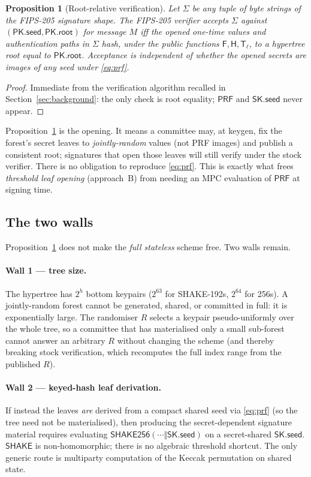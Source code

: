 \documentclass[11pt,a4paper]{article}
\newtheorem{proposition}[theorem]{Proposition}
\newcommand{\PRF}{\mathsf{PRF}}
\newcommand{\Fhash}{\mathsf{F}}
\newcommand{\Hhash}{\mathsf{H}}
\newcommand{\Tl}{\mathsf{T}_{\ell}}
\newcommand{\skseed}{\mathsf{SK.seed}}
\newcommand{\pkseed}{\mathsf{PK.seed}}
\newcommand{\pkroot}{\mathsf{PK.root}}
\begin{document}
\begin{proposition}[Root-relative verification]
\label{prop:root}
Let $\Sigma$ be any tuple of byte strings of the FIPS-205 signature shape. The
FIPS-205 verifier accepts $\Sigma$ against $(\pkseed,\pkroot)$ for message $M$ iff
the opened one-time values and authentication paths in $\Sigma$ hash, under the
public functions $\Fhash,\Hhash,\Tl$, to a hypertree root equal to $\pkroot$.
Acceptance is independent of whether the opened secrets are images of any seed
under \eqref{eq:prf}.
\end{proposition}
\begin{proof}
Immediate from the verification algorithm recalled in Section~\ref{sec:background}:
the only check is root equality; $\PRF$ and $\skseed$ never appear.
\end{proof}

Proposition~\ref{prop:root} is the opening. It means a committee may, at keygen, fix
the forest's secret leaves to \emph{jointly-random} values (not PRF images) and
publish a consistent root; signatures that open those leaves will still verify under
the stock verifier. There is no obligation to reproduce \eqref{eq:prf}. This is
exactly what frees \emph{threshold leaf opening} (approach~B) from needing an MPC
evaluation of $\PRF$ at signing time.

\subsection{The two walls}
\label{sec:walls}

Proposition~\ref{prop:root} does not make the \emph{full stateless} scheme free.
Two walls remain.

\paragraph{Wall 1 --- tree size.} The hypertree has $2^h$ bottom keypairs
($2^{63}$ for SHAKE-192s, $2^{64}$ for 256s). A jointly-random forest cannot be
generated, shared, or committed in full: it is exponentially large. The randomiser
$R$ selects a keypair pseudo-uniformly over the whole tree, so a committee that has
materialised only a small sub-forest cannot answer an arbitrary $R$ without changing
the scheme (and thereby breaking stock verification, which recomputes the full
index range from the published $R$).

\paragraph{Wall 2 --- keyed-hash leaf derivation.} If instead the leaves \emph{are}
derived from a compact shared seed via \eqref{eq:prf} (so the tree need not be
materialised), then producing the secret-dependent signature material requires
evaluating $\mathsf{SHAKE256}(\cdots \Vert \skseed)$ on a secret-shared $\skseed$.
$\mathsf{SHAKE}$ is non-homomorphic; there is no algebraic threshold shortcut. The
only generic route is multiparty computation of the Keccak permutation on shared
state.
\end{document}
